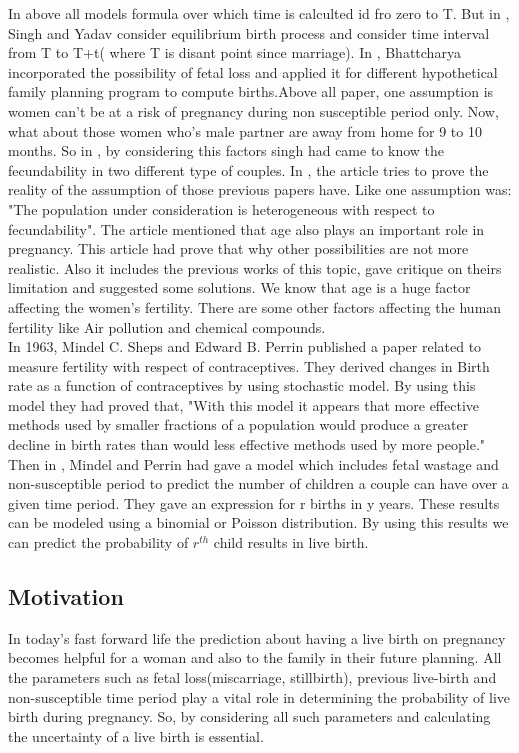 \documentclass{article}
\begin{document}
In above all models formula over which time is calculted id fro zero to T. But in \cite{7}, Singh and Yadav consider equilibrium birth process and consider time interval from T to T+t( where T is disant point since marriage).
In \cite{8}, Bhattcharya incorporated the possibility of fetal loss and applied it
for different hypothetical family planning program to compute births.Above all paper, one assumption is women can't be at a risk of pregnancy during non susceptible period only. Now, what about those women who's male partner are away from home for 9 to 10 months. So in \cite{9}, by considering this factors singh had came to know the fecundability in two different type of couples. In \cite{10}, the article tries to prove the reality of the assumption of those previous papers have. Like one assumption was: "The population under consideration is heterogeneous with respect to fecundability". The article mentioned that age also plays an important role in pregnancy. This article had prove that why other possibilities are not more realistic. Also it includes the previous works of this topic, gave critique on theirs limitation and suggested some solutions. We know that age is a huge factor affecting the women's fertility\cite{15}. There are some other factors affecting the human fertility like Air pollution and chemical compounds.
\newline
\\In 1963, Mindel C. Sheps and Edward B. Perrin published a paper related to measure fertility with respect of contraceptives\cite{11}. They derived changes in Birth rate as a function of contraceptives by using stochastic model. By using this model they had proved that, "With this model it appears that more effective methods used by smaller fractions of a population would produce a greater decline in birth rates than would less effective methods used by more people." Then in \cite{12}, Mindel and Perrin had gave a model which includes fetal wastage and non-susceptible period to predict the number of children a couple can have over a given time period. They gave an expression for r births in y years. These results can be modeled using a binomial or Poisson distribution. By using this results we can predict the probability of $r^{th}$ child results in live birth. 
\subsection{Motivation}
In today’s fast forward life the prediction about having a live birth on pregnancy becomes helpful for a woman and also to the family in their future planning. All the parameters such as fetal loss(miscarriage, stillbirth), previous live-birth and non-susceptible time period play a vital role in determining the probability of live birth during pregnancy. So, by considering all such parameters and calculating the uncertainty of a live birth is essential.
\end{document}
